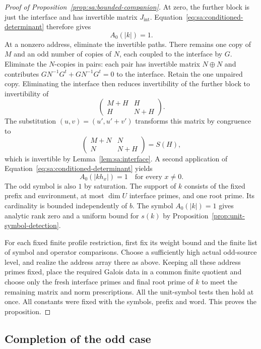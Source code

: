 \begin{proof}[Proof of Proposition~\ref{prop:sa:bounded-companion}]
At zero, the further block is just the interface and has invertible
matrix $J_{\mathrm{int}}$.  Equation~\eqref{eq:sa:conditioned-determinant}
therefore gives
\begin{equation}
 A_0(|k|)=1.
 \label{eq:sa:auxiliary-unit}
\end{equation}
At a nonzero address, eliminate the invertible paths.  There remains
one copy of $M$ and an odd number of copies of $N$, each coupled
to the interface by $G$.  Eliminate the $N$-copies in pairs:
each pair has invertible matrix $N\oplus N$ and contributes
$GN^{-1}G^t+GN^{-1}G^t=0$ to the interface.  Retain the one
unpaired copy.  Eliminating the interface then reduces invertibility
of the further block to invertibility of
\[
 \begin{pmatrix}M+H&H\\H&N+H\end{pmatrix}.
\]
The substitution $(u,v)=(u',u'+v')$ transforms this matrix by
congruence to
\[
 \begin{pmatrix}M+N&N\\N&N+H\end{pmatrix}
 =S(H),
\]
which is invertible by Lemma~\ref{lem:sa:interface}.  A second
application of Equation~\eqref{eq:sa:conditioned-determinant} yields
\begin{equation}
 A_0(|k h_x|)=1\quad\text{for every }x\ne0.
 \label{eq:sa:paired-units}
\end{equation}
The odd symbol is also $1$ by saturation. The support of $k$ consists
of the fixed prefix and environment, at most $\dim U$ interface
primes, and one root prime. Its cardinality is bounded independently
of $b$. The symbol $A_0(|k|)=1$ gives analytic rank zero and a uniform
bound for $s(k)$ by Proposition~\ref{prop:unit-symbol-detection}.

For each fixed finite profile restriction, first fix its weight bound
and the finite list of symbol and operator comparisons. Choose a
sufficiently high actual odd-source level, and realize the address
array there as above. Keeping all these address primes fixed, place
the required Galois data in a common finite quotient and choose only
the fresh interface primes and final root prime of $k$ to meet the
remaining matrix and norm prescriptions. All the unit-symbol tests
then hold at once. All constants were fixed
with the symbols, prefix and word. This proves the proposition.
\end{proof}

\subsection{Completion of the odd case}

